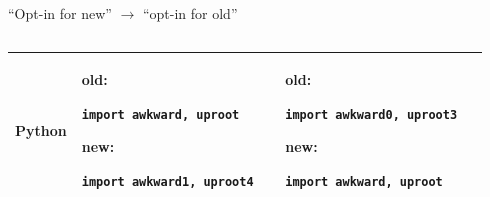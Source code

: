 \documentclass[aspectratio=169]{beamer}
\begin{document}
\begin{frame}{``Opt-in for new'' $\longrightarrow$ ``opt-in for old''}
\begin{columns}
\begin{tabular}{p{0.1\linewidth} | p{0.42\linewidth} | p{0.42\linewidth}}
{\bf Python} & \begin{minipage}{\linewidth}
\vspace{0.15 cm}
old:

{\small \texttt{import awkward, uproot}}

new:

{\small \texttt{import awkward1, uproot4}}
\vspace{0.15 cm}
\end{minipage} & \begin{minipage}{\linewidth}
\vspace{0.15 cm}
old:

{\small \texttt{import awkward0, uproot3}}

new:

{\small \texttt{import awkward, uproot}}
\vspace{0.15 cm}
\end{minipage} \\\hline
\end{tabular}
\end{columns}
\end{frame}
\end{document}
